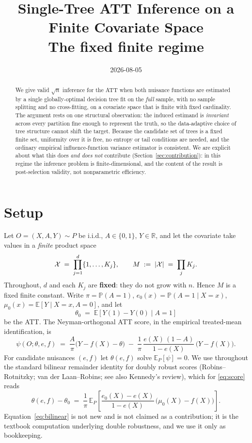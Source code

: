 \documentclass[11pt]{article}
\title{Single-Tree ATT Inference on a Finite Covariate Space\\
\large The fixed finite regime}
\author{}
\date{2026-08-05}
\theoremstyle{plain}
\theoremstyle{definition}
\theoremstyle{remark}
\newcommand{\E}{\mathbb{E}}
\newcommand{\PP}{\mathbb{P}}
\newcommand{\R}{\mathbb{R}}
\newcommand{\cX}{\mathcal{X}}
\newcommand{\ez}{e_0}
\newcommand{\mz}{\mu_0}
\DeclarePairedDelimiter{\card}{\lvert}{\rvert}
\begin{document}
\maketitle

\begin{abstract}
We give valid $\sqrt n$ inference for the ATT when both nuisance functions are
estimated by a single globally-optimal decision tree fit on the \emph{full}
sample, with no sample splitting and no cross-fitting, on a covariate space that
is finite with fixed cardinality. The argument rests on one structural
observation: the induced estimand is \emph{invariant} across every partition fine
enough to represent the truth, so the data-adaptive choice of tree structure
cannot shift the target. Because the candidate set of trees is a fixed finite
set, uniformity over it is free, no entropy or tail conditions are needed, and
the ordinary empirical influence-function variance estimator is consistent. We
are explicit about what this does \emph{and does not} contribute
(Section~\ref{sec:contribution}): in this regime the inference problem is
finite-dimensional, and the content of the result is post-selection validity, not
nonparametric efficiency.
\end{abstract}

\section{Setup}\label{sec:setup}

Let $O=(X,A,Y)\sim P$ be i.i.d., $A\in\{0,1\}$, $Y\in\R$, and let the covariate
take values in a \emph{finite} product space
\[
  \cX \;=\; \prod_{j=1}^{d}\{1,\dots,K_j\},
  \qquad M \;:=\; \card{\cX} \;=\; \prod_j K_j .
\]
Throughout, $d$ and each $K_j$ are \textbf{fixed}: they do not grow with $n$.
Hence $M$ is a fixed finite constant. Write $\pi=\PP(A=1)$,
$\ez(x)=\PP(A=1\mid X=x)$, $\mz(x)=\E[Y\mid X=x,A=0]$, and let
\[
  \theta_0 \;=\; \E[Y(1)-Y(0)\mid A=1]
\]
be the ATT. The Neyman-orthogonal ATT score, in the empirical treated-mean
identification, is
\begin{equation}\label{eq:score}
  \psi(O;\theta,e,f)
  \;=\; \frac{A}{\pi}\bigl(Y-f(X)-\theta\bigr)
    \;-\; \frac{1}{\pi}\,\frac{e(X)\,(1-A)}{1-e(X)}\,\bigl(Y-f(X)\bigr).
\end{equation}
For candidate nuisances $(e,f)$ let $\theta(e,f)$ solve $\E_P[\psi]=0$. We use
throughout the standard bilinear remainder identity for doubly robust scores
(Robins--Rotnitzky; van der Laan--Robins; see also Kennedy's review), which for
\eqref{eq:score} reads
\begin{equation}\label{eq:bilinear}
  \theta(e,f)-\theta_0
  \;=\; \frac{1}{\pi}\,\E_P\!\left[\frac{\ez(X)-e(X)}{1-e(X)}\,
        \bigl(\mz(X)-f(X)\bigr)\right].
\end{equation}
Equation~\eqref{eq:bilinear} is not new and is not claimed as a contribution; it
is the textbook computation underlying double robustness, and we use it only as
bookkeeping.
\end{document}
